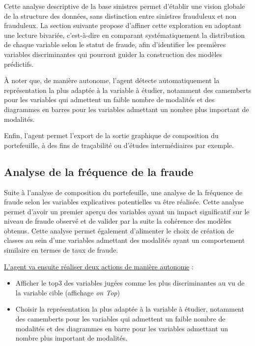 Cette analyse descriptive de la base sinistres permet d'établir une vision globale de la structure des données, sans distinction entre sinistres frauduleux et non frauduleux. La section suivante propose d'affiner cette exploration en adoptant une lecture bivariée, c'est-à-dire en comparant systématiquement la distribution de chaque variable selon le statut de fraude, afin d'identifier les premières variables discriminantes qui pourront guider la construction des modèles prédictifs.

À noter que, de manière autonome, l'agent détecte automatiquement la représentation la plus adaptée à la variable à étudier, notamment des camemberts pour les variables qui admettent un faible nombre de modalités et des diagrammes en barres pour les variables admettant un nombre plus important de modalités.

Enfin, l'agent permet l'export de la sortie graphique de composition du portefeuille, à des fins de traçabilité ou d'études intermédiaires par exemple.

\subsection{Analyse de la fréquence de la fraude}
\label{subsec:analyse-frequence}

Suite à l'analyse de composition du portefeuille, une analyse de la fréquence de fraude selon les variables explicatives potentielles va être réalisée. Cette analyse permet d'avoir un premier aperçu des variables ayant un impact significatif sur le niveau de fraude observé et de valider par la suite la cohérence des modèles obtenus. Cette analyse permet également d'alimenter le choix de création de classes au sein d'une variables admettant des modalités ayant un comportement similaire en termes de taux de fraude.

\underline{L'agent va ensuite réaliser deux actions de manière autonome} :

\begin{itemize}[label = $\bullet$]
    \item Afficher le top3 des variables jugées comme les plus discriminantes au vu de la variable cible (affichage \textit{on Top})
    \item Choisir la représentation la plus adaptée à la variable à étudier, notamment des camemberts pour les variables qui admettent un faible nombre de modalités et des diagrammes en barre pour les variables admettant un nombre plus important de modalités.
\end{itemize}

